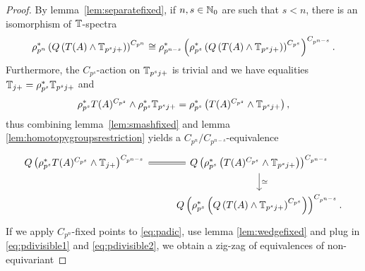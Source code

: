 \begin{proof}

By lemma~\ref{lem:separatefixed}, if $n,s \in \mathbb{N}_0$ are such that 
$s < n$, there is an isomorphism of $\mathbb{T}$-spectra
\begin{equation}
\rho^\ast_{ p^{ n } } \left( Q \left( T(A) \wedge 
\mathbb{T}_{p^sj+} \right) \right)^{ C_{ p^{n}} }
\cong 
\rho^\ast_{ p^{ n - s } } \left(  \rho_{ p^s }^\ast \left( Q 
\left( T(A) \wedge \mathbb{T}_{p^sj+} \right) 
\right)^{ C_{ p^s } } \right)^{ C_{ p^{ n - s} } }.
\end{equation}
Furthermore,  the $C_{ p^s }$-action on 
$\mathbb{T}_{p^sj+}$ is trivial and we have
equalities $\mathbb{T}_{j+} = \rho^\ast_{p^s}\mathbb{T}_{p^sj+}$
and 
\[
\rho_{ p^s }^\ast T(A) ^{ C_{ p^s } } \wedge 
\rho_{ p^s }^\ast \mathbb{T}_{p^sj+}  = 
\rho_{ p^s }^\ast \left(T(A) ^{ C_{ p^s } } \wedge 
 \mathbb{T}_{p^sj+}\right) ,
\]
thus  combining lemma~\ref{lem:smashfixed} and lemma
\ref{lem:homotopygroupsrestriction}  
yields a $C_{p^n}/C_{p^{n-s}}$-equivalence
\begin{equation}\label{eq:pdivisible2}
\begin{tikzcd}
  Q \left( \rho_{ p^s }^\ast  
  T(A) ^{ C_{ p^s } } \wedge 
 \TT_{j+}\right) ^{ C_{ p^{ n - s} } }
\arrow[equal]{r}
& Q\left(\rho_{ p^s }^\ast 
\left( 
  T(A)  ^{ C_{ p^s } } \wedge 
  \TT_{p^sj+} \right)  \right)^{ C_{ p^{ n  - s} } }
\arrow{d}{\simeq}\\
&Q\left( \rho_{ p^s }^\ast \left( Q 
 \left( T(A) \wedge \TT_{p^sj+} \right)^{ C_{ p^s } } \right) \right)^{ C_{ p^{ n  - s} } }.
\end{tikzcd}
\end{equation}
If we apply $C_{p^n}$-fixed points to \eqref{eq:padic},  use lemma \ref{lem:wedgefixed} and
plug in \eqref{eq:pdivisible1} and \eqref{eq:pdivisible2},
we obtain a zig-zag of equivalences of non-equivariant

\end{proof}
